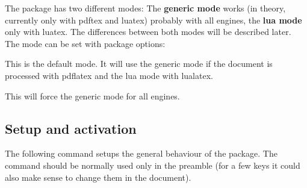 \documentclass[DIV=12,parskip=half-,bibliography=totoc]{scrartcl}
\begin{document}
The package has two different modes: The \textbf{generic mode} works (in theory, currently only with pdftex and luatex) probably with all engines, the \textbf{lua mode} only with luatex. The differences between both modes  will be described later. The mode can be set with package options:


This is the default mode. It will use the generic mode if the document is processed with pdflatex and the lua mode with lualatex.


This will force the generic mode for all engines.

\subsection{Setup and activation}\label{ssec:setup}

The following command setups the general behaviour of the package.
The command should be normally used only in the preamble (for a few keys it could also make sense to change them in the document).

\DescribeMacro{}
\end{document}

